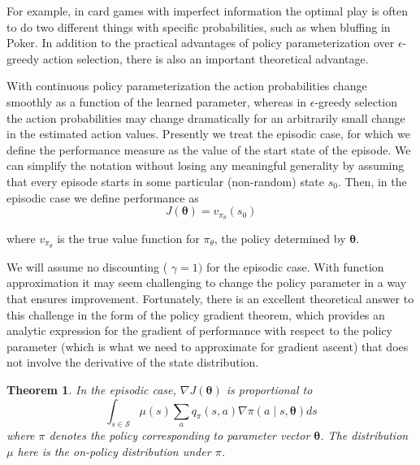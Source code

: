 \documentclass[11pt]{article}
\theoremstyle{plain} %
\newtheorem{theorem}{Theorem}[section]
\theoremstyle{remark}
\begin{document}
  For example, in card games with imperfect information the optimal play
  is often to do two different things with specific probabilities, such as when
  bluffing in Poker. In addition to the practical advantages of policy parameterization over
  $\epsilon$-greedy action selection, there is also an important theoretical
  advantage.

 With continuous policy parameterization the action probabilities change
  smoothly as a function of the learned parameter, whereas in $\epsilon$-greedy
  selection the action probabilities may change dramatically for an arbitrarily
  small change in the estimated action values. Presently we treat the episodic case, for which we define the
  performance measure as the value of the start state of the episode. We can simplify the notation without losing any meaningful generality by
  assuming that every episode starts in some particular (non-random) state
  $s_{0}$. Then, in the episodic case we define performance as
$$
J(\boldsymbol{\theta})=v_{\pi_{\theta}}\left(s_{0}\right)
$$

where $v_{\pi_{\theta}}$ is the true value function for $\pi_{\theta}$, the
policy determined by $\boldsymbol{\theta}$.

 We will assume no discounting ( $\gamma=1)$ for the episodic case. With function approximation it may seem challenging to change the policy
  parameter in a way that ensures improvement. Fortunately, there is an excellent theoretical answer to this challenge
  in the form of the policy gradient theorem, which provides an analytic
  expression for the gradient of performance with respect to the policy
  parameter (which is what we need to approximate for gradient ascent) that does
  not involve the derivative of the state distribution.

\begin{theorem}
  In the episodic case, $\nabla J(\boldsymbol{\theta})$ is proportional to
$$
\int_{s \in \mathcal{S}} \mu(s) \sum_{a} q_{\pi}(s, a) \nabla \pi(a \mid s, \boldsymbol{\theta}) d s
$$
where $\pi$ denotes the policy corresponding to parameter vector
$\boldsymbol{\theta}$. The distribution $\mu$ here is the on-policy distribution
under $\pi$.
\end{theorem}
\end{document}
